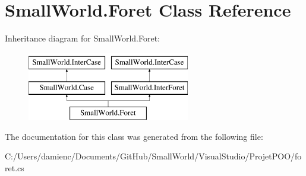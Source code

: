 \hypertarget{class_small_world_1_1_foret}{\section{Small\-World.\-Foret Class Reference}
\label{class_small_world_1_1_foret}
}
Inheritance diagram for Small\-World.\-Foret\-:\begin{figure}[H]
\begin{center}
\leavevmode
\includegraphics[height=3.000000cm]{class_small_world_1_1_foret}
\end{center}
\end{figure}


The documentation for this class was generated from the following file\-:\begin{DoxyCompactItemize}
\item 
C\-:/\-Users/damienc/\-Documents/\-Git\-Hub/\-Small\-World/\-Visual\-Studio/\-Projet\-P\-O\-O/foret.\-cs\end{DoxyCompactItemize}
